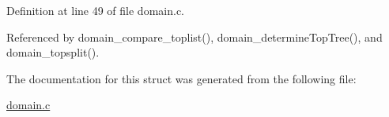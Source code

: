 Definition at line 49 of file domain.c.



Referenced by domain\_\-compare\_\-toplist(), domain\_\-determineTopTree(), and domain\_\-topsplit().



The documentation for this struct was generated from the following file:\begin{DoxyCompactItemize}
\item 
\hyperlink{domain_8c}{domain.c}\end{DoxyCompactItemize}
